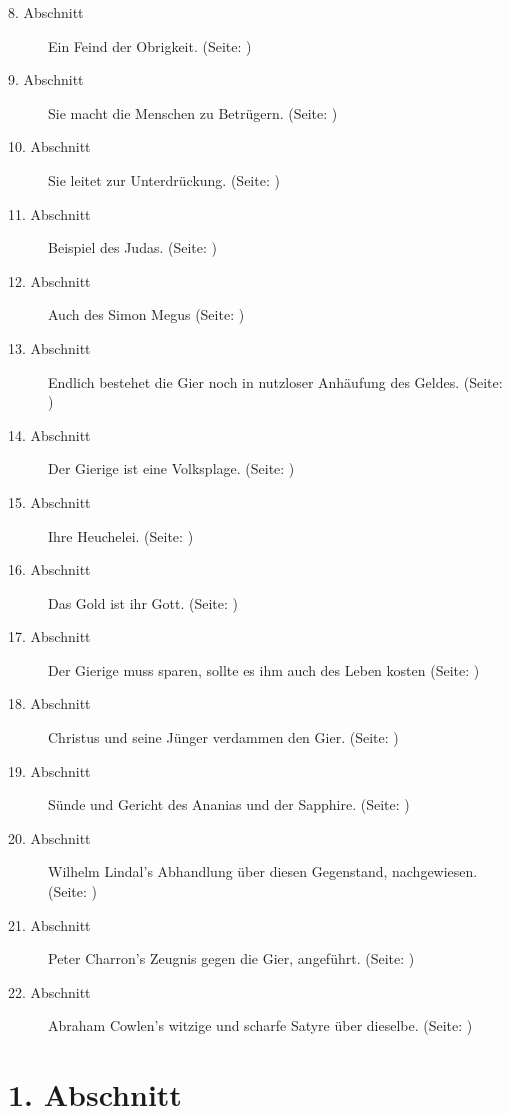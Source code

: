 \begin{description}
\item[8. Abschnitt] Ein Feind der Obrigkeit. (Seite: \pageref{kap13_ab8})
\item[9. Abschnitt] Sie macht die Menschen zu Betrügern. (Seite: \pageref{kap13_ab9})
\item[10. Abschnitt] Sie leitet zur Unterdrückung. (Seite: \pageref{kap13_ab10})
\item[11. Abschnitt] Beispiel des Judas. (Seite: \pageref{kap13_ab11})
\item[12. Abschnitt] Auch des Simon Megus (Seite: \pageref{kap13_ab12})
\item[13. Abschnitt] Endlich bestehet die Gier noch in nutzloser Anhäufung des
Geldes.  (Seite: \pageref{kap13_ab13})
\item[14. Abschnitt] Der Gierige ist eine Volksplage.  (Seite: \pageref{kap13_ab14})
\item[15. Abschnitt] Ihre Heuchelei. (Seite: \pageref{kap13_ab15})
\item[16. Abschnitt] Das Gold ist ihr Gott. (Seite: \pageref{kap13_ab16})
\item[17. Abschnitt] Der Gierige muss sparen, sollte es ihm auch des Leben kosten (Seite: \pageref{kap13_ab17})
\item[18. Abschnitt] Christus und seine Jünger verdammen den Gier. (Seite: \pageref{kap13_ab18})
\item[19. Abschnitt] Sünde und Gericht des Ananias und der Sapphire. (Seite: \pageref{kap13_ab19})
\item[20. Abschnitt] Wilhelm Lindal's Abhandlung über diesen Gegenstand,
nachgewiesen. (Seite: \pageref{kap13_ab20})
\item[21. Abschnitt] Peter Charron's Zeugnis gegen die Gier, angeführt. (Seite: \pageref{kap13_ab21})
\item[22. Abschnitt] Abraham Cowlen's witzige und scharfe Satyre über dieselbe. (Seite: \pageref{kap13_ab22})

\end{description}
\normalsize


\section{1. Abschnitt} \label{kap13_ab1} 

